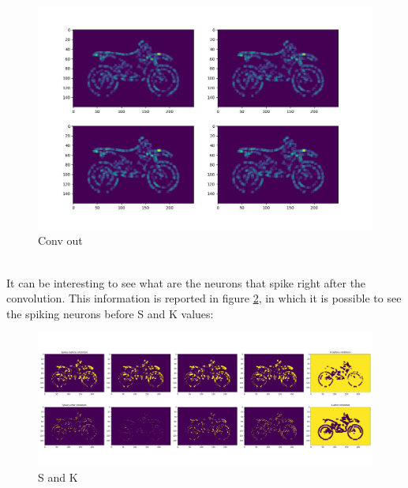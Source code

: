 \documentclass[11pt,a4paper]{scrartcl}
\begin{document}
\begin{figure}[h]
	\centering
	\includegraphics[width=\textwidth]{images/conv_output_slice3_cut}
	\caption{Conv out}
	\label{fig:conv_out}
\end{figure}\\
It can be interesting to see what are the neurons that spike right after the convolution. This information is reported in figure \ref{fig:s_k}, in which it is possible to see the spiking neurons before 
S and K values:
\begin{figure}[h]
	\centering
	\includegraphics[width=\textwidth]{images/S_K_values_slice2}
	\caption{S and K}
	\label{fig:s_k}
\end{figure}\\
\end{document}
